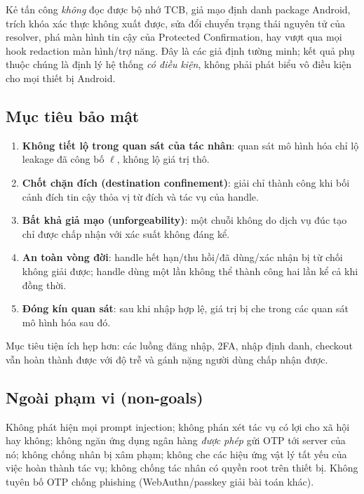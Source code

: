 \documentclass[11pt,a4paper]{article}
\newcommand{\term}[1]{\textbf{#1}}
\begin{document}
Kẻ tấn công \emph{không} đọc được bộ nhớ TCB, giả mạo định danh package Android, trích khóa xác thực không
xuất được, sửa đổi chuyển trạng thái nguyên tử của resolver, phá màn hình tin cậy của Protected Confirmation,
hay vượt qua mọi hook redaction màn hình/trợ năng. Đây là các giả định tường minh; kết quả phụ thuộc chúng là
định lý hệ thống \emph{có điều kiện}, không phải phát biểu vô điều kiện cho mọi thiết bị Android.

\subsection{Mục tiêu bảo mật}

\begin{enumerate}
  \item \term{Không tiết lộ trong quan sát của tác nhân}: quan sát mô hình hóa chỉ lộ leakage đã công bố $\ell$,
        không lộ giá trị thô.
  \item \term{Chốt chặn đích (destination confinement)}: giải chỉ thành công khi bối cảnh đích tin cậy thỏa
        vị từ đích và tác vụ của handle.
  \item \term{Bất khả giả mạo (unforgeability)}: một chuỗi không do dịch vụ đúc tạo chỉ được chấp nhận với xác
        suất không đáng kể.
  \item \term{An toàn vòng đời}: handle hết hạn/thu hồi/đã dùng/xác nhận bị từ chối không giải được; handle
        dùng một lần không thể thành công hai lần kể cả khi đồng thời.
  \item \term{Đóng kín quan sát}: sau khi nhập hợp lệ, giá trị bị che trong các quan sát mô hình hóa sau đó.
\end{enumerate}

Mục tiêu tiện ích hẹp hơn: các luồng đăng nhập, 2FA, nhập định danh, checkout vẫn hoàn thành được với độ trễ
và gánh nặng người dùng chấp nhận được.

\subsection{Ngoài phạm vi (non-goals)}

Không phát hiện mọi prompt injection; không phán xét tác vụ có lợi cho xã hội hay không; không ngăn ứng dụng
ngân hàng \emph{được phép} gửi OTP tới server của nó; không chống nhân bị xâm phạm; không che các hiệu ứng vật
lý tất yếu của việc hoàn thành tác vụ; không chống tác nhân có quyền root trên thiết bị. Không tuyên bố OTP chống
phishing (WebAuthn/passkey giải bài toán khác).
\end{document}
